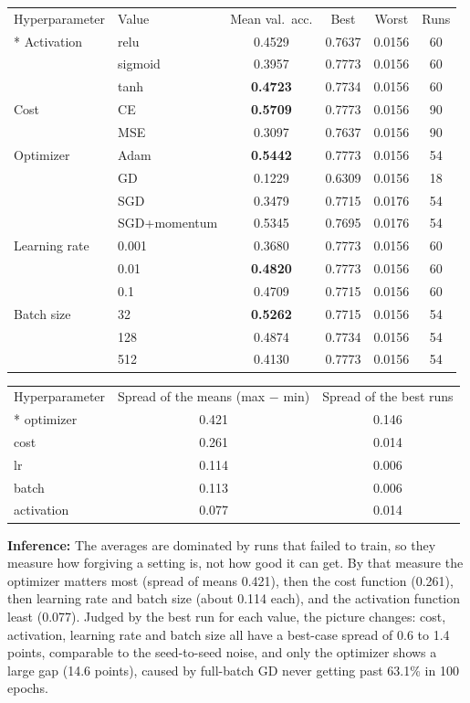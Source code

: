 \documentclass[12pt,a4paper]{article}
\begin{document}
{\small\setlength{\tabcolsep}{4pt}
\begin{longtable}{llcccc}
\toprule
Hyperparameter & Value & Mean val.\ acc. & Best & Worst & Runs \\*
\midrule
Activation & relu & 0.4529 & 0.7637 & 0.0156 & 60 \\
 & sigmoid & 0.3957 & 0.7773 & 0.0156 & 60 \\
 & tanh & \textbf{0.4723} & 0.7734 & 0.0156 & 60 \\
Cost & CE & \textbf{0.5709} & 0.7773 & 0.0156 & 90 \\
 & MSE & 0.3097 & 0.7637 & 0.0156 & 90 \\
Optimizer & Adam & \textbf{0.5442} & 0.7773 & 0.0156 & 54 \\
 & GD & 0.1229 & 0.6309 & 0.0156 & 18 \\
 & SGD & 0.3479 & 0.7715 & 0.0176 & 54 \\
 & SGD+momentum & 0.5345 & 0.7695 & 0.0176 & 54 \\
Learning rate & 0.001 & 0.3680 & 0.7773 & 0.0156 & 60 \\
 & 0.01 & \textbf{0.4820} & 0.7773 & 0.0156 & 60 \\
 & 0.1 & 0.4709 & 0.7715 & 0.0156 & 60 \\
Batch size & 32 & \textbf{0.5262} & 0.7715 & 0.0156 & 54 \\
 & 128 & 0.4874 & 0.7734 & 0.0156 & 54 \\
 & 512 & 0.4130 & 0.7773 & 0.0156 & 54 \\
\bottomrule
\end{longtable}
}

{\small\setlength{\tabcolsep}{4pt}
\begin{longtable}{lcc}
\toprule
Hyperparameter & Spread of the means (max $-$ min) & Spread of the best runs \\*
\midrule
optimizer & 0.421 & 0.146 \\
cost & 0.261 & 0.014 \\
lr & 0.114 & 0.006 \\
batch & 0.113 & 0.006 \\
activation & 0.077 & 0.014 \\
\bottomrule
\end{longtable}
}

\textbf{Inference:} The averages are dominated by runs that failed to train, so they measure how
forgiving a setting is, not how good it can get. By that measure the optimizer matters most
(spread of means 0.421), then the cost function
(0.261), then learning rate and batch size (about
0.114 each), and the activation function least
(0.077). Judged by the best run for each value, the picture
changes: cost, activation, learning rate and batch size all have a best-case spread of
0.6 to 1.4 points, comparable to
the seed-to-seed noise, and only the optimizer shows a large gap
(14.6 points), caused by full-batch GD never getting past
63.1\% in 100 epochs.
\end{document}

